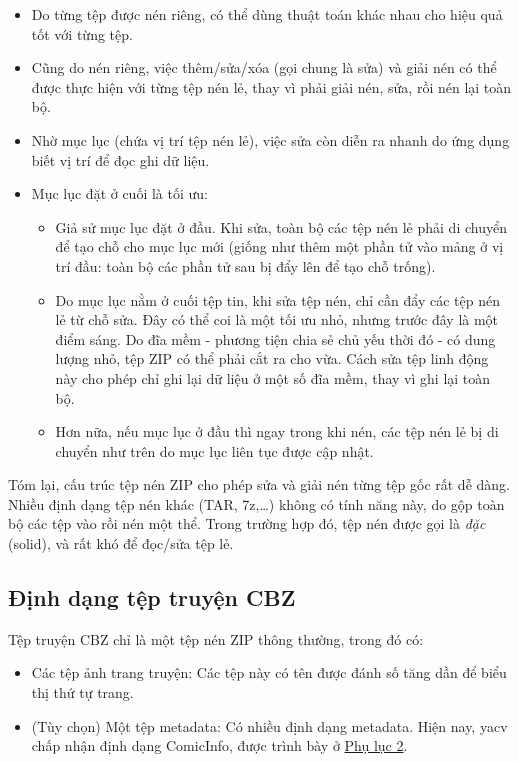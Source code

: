\documentclass[../../thesis]{subfiles}
\begin{document}
\begin{itemize}
    \item
        Do từng tệp được nén riêng, có thể dùng thuật toán khác nhau cho hiệu
        quả tốt với từng tệp.
    \item
        Cũng do nén riêng, việc thêm/sửa/xóa (gọi chung là sửa) và giải nén có
        thể được thực hiện với từng tệp nén lẻ, thay vì phải giải nén, sửa, rồi
        nén lại toàn bộ.
    \item
        Nhờ mục lục (chứa vị trí tệp nén lẻ), việc sửa còn diễn ra nhanh do ứng
        dụng biết vị trí để đọc ghi dữ liệu.
    \item
        Mục lục đặt ở cuối là tối ưu:

        \begin{itemize}
            \item
                Giả sử mục lục đặt ở đầu. Khi sửa, toàn bộ các tệp nén lẻ phải
                di chuyển để tạo chỗ cho mục lục mới (giống như thêm một phần tử
                vào mảng ở vị trí đầu: toàn bộ các phần tử sau bị đẩy lên để tạo
                chỗ trống).
            \item
                Do mục lục nằm ở cuối tệp tin, khi sửa tệp nén, chỉ cần đẩy các
                tệp nén lẻ từ chỗ sửa. Đây có thể coi là một tối ưu nhỏ, nhưng
                trước đây là một điểm sáng. Do đĩa mềm - phương tiện chia sẻ chủ
                yếu thời đó - có dung lượng nhỏ, tệp ZIP có thể phải cắt ra cho
                vừa. Cách sửa tệp linh động này cho phép chỉ ghi lại dữ liệu ở
                một số đĩa mềm, thay vì ghi lại toàn bộ.
            \item
                Hơn nữa, nếu mục lục ở đầu thì ngay trong khi nén, các tệp nén
                lẻ bị di chuyển như trên do mục lục liên tục được cập nhật.
        \end{itemize}
\end{itemize}

Tóm lại, cấu trúc tệp nén ZIP cho phép sửa và giải nén từng tệp gốc rất dễ dàng.
Nhiều định dạng tệp nén khác (TAR, 7z,\ldots) không có tính năng này, do gộp
toàn bộ các tệp vào rồi nén một thể. Trong trường hợp đó, tệp nén được gọi là
\emph{đặc} (solid), và rất khó để đọc/sửa tệp lẻ.

\subsection{Định dạng tệp truyện CBZ}

Tệp truyện CBZ chỉ là một tệp nén ZIP thông thường, trong đó có:

\begin{itemize}
    \item
        Các tệp ảnh trang truyện: Các tệp này có tên được đánh số tăng dần để
        biểu thị thứ tự trang.
    \item
        (Tùy chọn) Một tệp metadata: Có nhiều định dạng metadata. Hiện nay, yacv
        chấp nhận định dạng ComicInfo, được trình bày ở
        \protect\hyperlink{P8.2-comicinfo.xsd}{Phụ lục 2}.
\end{itemize}
\end{document}
